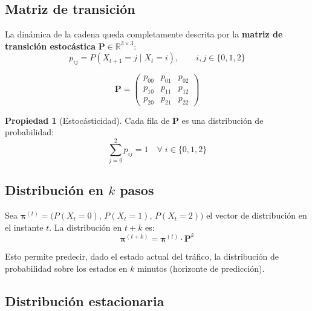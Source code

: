 \documentclass[12pt, a4paper]{article}
\theoremstyle{definition}
\newtheorem{propiedad}{Propiedad}[section]
\begin{document}
\subsection{Matriz de transición}

La dinámica de la cadena queda completamente descrita por la
\textbf{matriz de transición estocástica} $\mathbf{P} \in \mathbb{R}^{3 \times 3}$:
\begin{equation}
    p_{ij} = P(X_{t+1} = j \mid X_t = i), \qquad i,j \in \{0,1,2\}
    \label{eq:transition_prob}
\end{equation}

\begin{equation}
    \mathbf{P} =
    \begin{pmatrix}
        p_{00} & p_{01} & p_{02} \\
        p_{10} & p_{11} & p_{12} \\
        p_{20} & p_{21} & p_{22}
    \end{pmatrix}
    \label{eq:matrix_P}
\end{equation}

\begin{propiedad}[Estocásticidad]
Cada fila de $\mathbf{P}$ es una distribución de probabilidad:
\begin{equation}
    \sum_{j=0}^{2} p_{ij} = 1 \quad \forall\; i \in \{0,1,2\}
    \label{eq:stochastic}
\end{equation}
\end{propiedad}

\subsection{Distribución en $k$ pasos}

Sea $\bm{\pi}^{(t)} = \bigl(P(X_t=0),\, P(X_t=1),\, P(X_t=2)\bigr)$
el vector de distribución en el instante $t$. La distribución en $t+k$ es:
\begin{equation}
    \bm{\pi}^{(t+k)} = \bm{\pi}^{(t)} \cdot \mathbf{P}^k
    \label{eq:k_step}
\end{equation}

Esto permite predecir, dado el estado actual del tráfico, la distribución
de probabilidad sobre los estados en $k$ minutos (horizonte de predicción).

\subsection{Distribución estacionaria}
\end{document}
